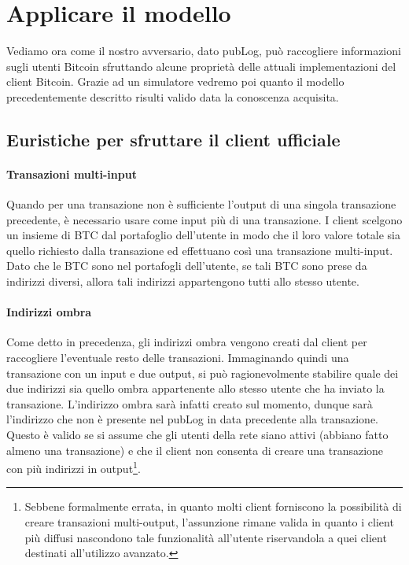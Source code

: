 \section{Applicare il modello}\label{valutazione-della-privacy-in-bitcoin}

Vediamo ora come il nostro avversario, dato pubLog, può raccogliere informazioni sugli utenti Bitcoin sfruttando alcune proprietà delle attuali implementazioni del client Bitcoin.
Grazie ad un simulatore vedremo poi quanto il modello precedentemente descritto risulti valido data la conoscenza acquisita.

\subsection{Euristiche per sfruttare il client ufficiale}

\paragraph{Transazioni multi-input}

Quando per una transazione non è sufficiente l'output di una singola transazione precedente, è necessario usare come input più di una transazione.
I client scelgono un insieme di BTC dal portafoglio dell'utente in modo che il loro valore totale sia quello richiesto dalla transazione ed effettuano così una transazione multi-input.
Dato che le BTC sono nel portafogli dell'utente, se tali BTC sono prese da indirizzi diversi, allora tali indirizzi appartengono tutti allo stesso utente.

\paragraph{Indirizzi ombra}

Come detto in precedenza, gli indirizzi ombra vengono creati dal client per raccogliere l'eventuale resto delle transazioni.
Immaginando quindi una transazione con un input e due output, si può ragionevolmente stabilire quale dei due indirizzi sia quello ombra appartenente allo stesso utente che ha inviato la transazione. L'indirizzo ombra sarà infatti creato sul momento, dunque sarà l'indirizzo che non è presente nel pubLog in data precedente alla transazione.
Questo è valido se si assume che gli utenti della rete siano attivi (abbiano fatto almeno una transazione) e che il client non consenta di creare una transazione con più indirizzi in output\footnote{Sebbene formalmente errata, in quanto molti client forniscono la possibilità di creare transazioni multi-output, l'assunzione rimane valida in quanto i client più diffusi nascondono tale funzionalità all'utente riservandola a quei client destinati all'utilizzo avanzato.}.

